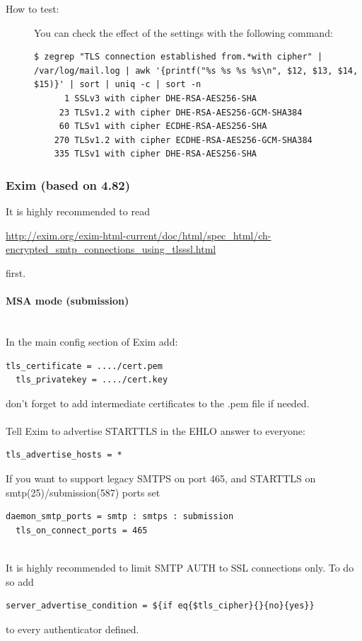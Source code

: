 \begin{description}
\item[How to test:]

You can check the effect of the settings with the following command:
\begin{lstlisting}[breaklines]
$ zegrep "TLS connection established from.*with cipher" | /var/log/mail.log | awk '{printf("%s %s %s %s\n", $12, $13, $14, $15)}' | sort | uniq -c | sort -n
      1 SSLv3 with cipher DHE-RSA-AES256-SHA
     23 TLSv1.2 with cipher DHE-RSA-AES256-GCM-SHA384
     60 TLSv1 with cipher ECDHE-RSA-AES256-SHA
    270 TLSv1.2 with cipher ECDHE-RSA-AES256-GCM-SHA384
    335 TLSv1 with cipher DHE-RSA-AES256-SHA
\end{lstlisting}

\end{description}

\subsubsection{Exim (based on 4.82)}

It is highly recommended to read

\url{http://exim.org/exim-html-current/doc/html/spec_html/ch-encrypted_smtp_connections_using_tlsssl.html}

first.

\paragraph*{MSA mode (submission)}\mbox{}\\

In the main config section of Exim add:

\begin{lstlisting}[breaklines]
  tls_certificate = ..../cert.pem
  tls_privatekey = ..../cert.key
\end{lstlisting}
don't forget to add intermediate certificates to the .pem file if needed.\\
\\
Tell Exim to advertise STARTTLS in the EHLO answer to everyone:
\begin{lstlisting}[breaklines]
  tls_advertise_hosts = *
\end{lstlisting}

If you want to support legacy SMTPS on port 465, and STARTTLS on smtp(25)/submission(587) ports set
\begin{lstlisting}[breaklines]
  daemon_smtp_ports = smtp : smtps : submission
  tls_on_connect_ports = 465
\end{lstlisting}
\mbox{}\\
It is highly recommended to limit SMTP AUTH to SSL connections only. To do so add
\begin{lstlisting}[breaklines]
  server_advertise_condition = ${if eq{$tls_cipher}{}{no}{yes}}
\end{lstlisting}
to every authenticator defined.\\


